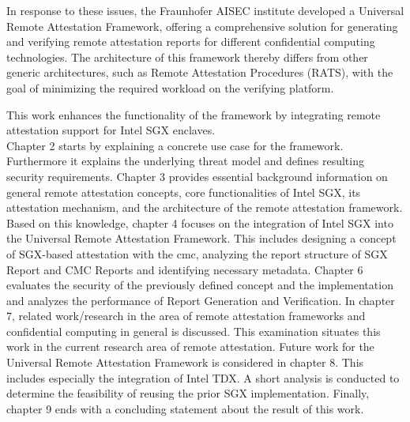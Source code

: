 In response to these issues, the Fraunhofer AISEC institute developed a Universal Remote Attestation Framework, offering a comprehensive solution for generating and verifying remote attestation reports for different confidential computing technologies. The architecture of this framework thereby differs from other generic architectures, such as Remote Attestation Procedures (RATS), with the goal of minimizing the required workload on the verifying platform.  

This work enhances the functionality of the framework by integrating remote attestation support for Intel SGX enclaves.\\

Chapter 2 starts by explaining a concrete use case for the framework. Furthermore it explains the underlying threat model and defines resulting security requirements. Chapter 3 provides essential background information on general remote attestation concepts, core functionalities of Intel SGX, its attestation mechanism, and the architecture of the remote attestation framework. Based on this knowledge, chapter 4 focuses on the integration of Intel SGX into the Universal Remote Attestation Framework. This includes designing a concept of SGX-based attestation with the cmc, analyzing the report structure of SGX Report and CMC Reports and identifying necessary metadata. Chapter 6 evaluates the security of the previously defined concept and the implementation and analyzes the performance of Report Generation and Verification. 
In chapter 7, related work/research in the area of remote attestation frameworks and confidential computing in general is discussed. This examination situates this work in the current research area of remote attestation. 
Future work for the Universal Remote Attestation Framework is considered in chapter 8. This includes especially the integration of Intel TDX. A short analysis is conducted to determine the feasibility of reusing the prior SGX implementation. 
Finally, chapter 9 ends with a concluding statement about the result of this work.




